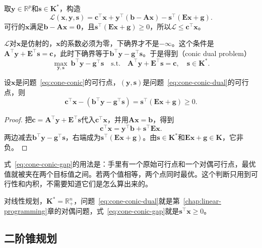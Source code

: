取$\bm{y}\in\mathbb{R}^p$和$\bm{s}\in\bm{K}^*$，构造
\[
 \mathcal{L}(\bm{x},\bm{y},\bm{s})=\bm{c}^\top\bm{x}+\bm{y}^\top(\bm{b}-\bm{A}\bm{x})-\bm{s}^\top(\bm{E}\bm{x}+\bm{g}).
\]
可行的$\bm{x}$满足$\bm{b}-\bm{A}\bm{x}=\bm{0}$，且$\bm{s}^\top(\bm{E}\bm{x}+\bm{g})\geq0$，所以$\mathcal{L}\leq\bm{c}^\top\bm{x}$。

$\mathcal{L}$对$\bm{x}$是仿射的，$\bm{x}$的系数必须为零，下确界才不是$-\infty$。这个条件是$\bm{A}^\top\bm{y}+\bm{E}^\top\bm{s}=\bm{c}$，此时下确界等于$\bm{b}^\top\bm{y}-\bm{g}^\top\bm{s}$。于是得到（conic dual problem）
\begin{equation}
 \max_{\bm{y},\bm{s}}\ \bm{b}^\top\bm{y}-\bm{g}^\top\bm{s}\quad\text{s.t.}\quad\bm{A}^\top\bm{y}+\bm{E}^\top\bm{s}=\bm{c},\quad\bm{s}\in\bm{K}^*.
 \label{eq:cone-conic-dual}
\end{equation}

\begin{theorem}[锥规划的弱对偶]
\label{thm:cone-weak-duality}
设$\bm{x}$是问题~\eqref{eq:cone-conic}的可行点，$(\bm{y},\bm{s})$是问题~\eqref{eq:cone-conic-dual}的可行点，则
\begin{equation}
 \bm{c}^\top\bm{x}-(\bm{b}^\top\bm{y}-\bm{g}^\top\bm{s})=\bm{s}^\top(\bm{E}\bm{x}+\bm{g})\geq0.
 \label{eq:cone-conic-gap}
\end{equation}
\end{theorem}

\begin{proof}
把$\bm{c}=\bm{A}^\top\bm{y}+\bm{E}^\top\bm{s}$代入$\bm{c}^\top\bm{x}$，并用$\bm{A}\bm{x}=\bm{b}$，得到
\[
 \bm{c}^\top\bm{x}=\bm{y}^\top\bm{b}+\bm{s}^\top\bm{E}\bm{x}.
\]
两边减去$\bm{b}^\top\bm{y}-\bm{g}^\top\bm{s}$，右端成为$\bm{s}^\top(\bm{E}\bm{x}+\bm{g})$。由$\bm{s}\in\bm{K}^*$和$\bm{E}\bm{x}+\bm{g}\in\bm{K}$，它非负。
\end{proof}

式~\eqref{eq:cone-conic-gap}的用法是：手里有一个原始可行点和一个对偶可行点，最优值就被夹在两个目标值之间。若两个值相等，两个点同时最优。这个判断只用到可行性和内积，不需要知道它们是怎么算出来的。

对线性规划，$\bm{K}^*=\mathbb{R}^n_+$，问题~\eqref{eq:cone-conic-dual}就是第~\ref{chap:linear-programming}章的对偶问题，式~\eqref{eq:cone-conic-gap}就是$\bm{s}^\top\bm{x}\geq0$。

\subsection{二阶锥规划}
\label{sec:cone-socp}

